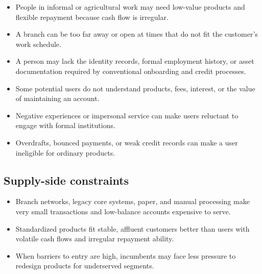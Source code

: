 \begin{itemize}
  \item {} People in informal or agricultural work may need low-value products and flexible repayment because cash flow is irregular.
  \item {} A branch can be too far away or open at times that do not fit the customer's work schedule.
  \item {} A person may lack the identity records, formal employment history, or asset documentation required by conventional onboarding and credit processes.
  \item {} Some potential users do not understand products, fees, interest, or the value of maintaining an account.
  \item {} Negative experiences or impersonal service can make users reluctant to engage with formal institutions.
  \item {} Overdrafts, bounced payments, or weak credit records can make a user ineligible for ordinary products.
\end{itemize}

\subsection{Supply-side constraints}

\begin{itemize}
  \item {} Branch networks, legacy core systems, paper, and manual processing make very small transactions and low-balance accounts expensive to serve.
  \item {} Standardized products fit stable, affluent customers better than users with volatile cash flows and irregular repayment ability.
  \item {} When barriers to entry are high, incumbents may face less pressure to redesign products for underserved segments.
\end{itemize}

